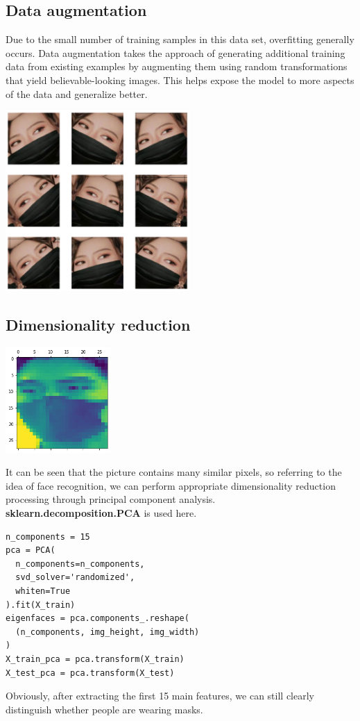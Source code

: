 \documentclass{article}
\begin{document}
\subsection{Data augmentation}
Due to the small number of training samples in this data set, overfitting generally occurs. Data augmentation takes the approach of generating additional training data from existing examples by augmenting them using random transformations that yield believable-looking images. This helps expose the model to more aspects of the data and generalize better.\\
\begin{center}
  \includegraphics[width=7cm]{augmentation.png}
\end{center}


\subsection{Dimensionality reduction}
\begin{center}
  \includegraphics[width=4cm]{pca.png}
\end{center}

It can be seen that the picture contains many similar pixels, so referring to the idea of face recognition, we can perform appropriate dimensionality reduction processing through principal component analysis.\\
\textbf{sklearn.decomposition.PCA} is used here.
\begin{lstlisting}
n_components = 15
pca = PCA(
  n_components=n_components,
  svd_solver='randomized',
  whiten=True
).fit(X_train)
eigenfaces = pca.components_.reshape(
  (n_components, img_height, img_width)
)
X_train_pca = pca.transform(X_train)
X_test_pca = pca.transform(X_test)
\end{lstlisting}
Obviously, after extracting the first 15 main features, we can still clearly distinguish whether people are wearing masks.
\end{document}
